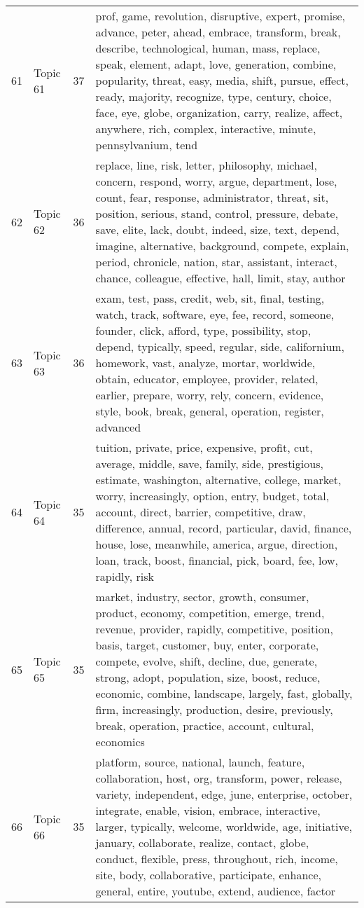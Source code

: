 \begin{table}[ht]
{\begin{tabularx}{\textwidth}{llrX}
   61 & Topic 61 & 37 & prof, game, revolution, disruptive, expert, promise, advance, peter, ahead, embrace, transform, break, describe, technological, human, mass, replace, speak, element, adapt, love, generation, combine, popularity, threat, easy, media, shift, pursue, effect, ready, majority, recognize, type, century, choice, face, eye, globe, organization, carry, realize, affect, anywhere, rich, complex, interactive, minute, pennsylvanium, tend \\ 
   62 & Topic 62 & 36 & replace, line, risk, letter, philosophy, michael, concern, respond, worry, argue, department, lose, count, fear, response, administrator, threat, sit, position, serious, stand, control, pressure, debate, save, elite, lack, doubt, indeed, size, text, depend, imagine, alternative, background, compete, explain, period, chronicle, nation, star, assistant, interact, chance, colleague, effective, hall, limit, stay, author \\ 
   63 & Topic 63 & 36 & exam, test, pass, credit, web, sit, final, testing, watch, track, software, eye, fee, record, someone, founder, click, afford, type, possibility, stop, depend, typically, speed, regular, side, californium, homework, vast, analyze, mortar, worldwide, obtain, educator, employee, provider, related, earlier, prepare, worry, rely, concern, evidence, style, book, break, general, operation, register, advanced \\ 
   64 & Topic 64 & 35 & tuition, private, price, expensive, profit, cut, average, middle, save, family, side, prestigious, estimate, washington, alternative, college, market, worry, increasingly, option, entry, budget, total, account, direct, barrier, competitive, draw, difference, annual, record, particular, david, finance, house, lose, meanwhile, america, argue, direction, loan, track, boost, financial, pick, board, fee, low, rapidly, risk \\ 
   65 & Topic 65 & 35 & market, industry, sector, growth, consumer, product, economy, competition, emerge, trend, revenue, provider, rapidly, competitive, position, basis, target, customer, buy, enter, corporate, compete, evolve, shift, decline, due, generate, strong, adopt, population, size, boost, reduce, economic, combine, landscape, largely, fast, globally, firm, increasingly, production, desire, previously, break, operation, practice, account, cultural, economics \\ 
   66 & Topic 66 & 35 & platform, source, national, launch, feature, collaboration, host, org, transform, power, release, variety, independent, edge, june, enterprise, october, integrate, enable, vision, embrace, interactive, larger, typically, welcome, worldwide, age, initiative, january, collaborate, realize, contact, globe, conduct, flexible, press, throughout, rich, income, site, body, collaborative, participate, enhance, general, entire, youtube, extend, audience, factor \\ 

\end{tabularx}}
\end{table}
